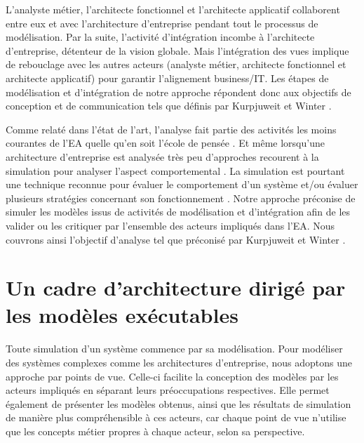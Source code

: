 L'analyste métier, l'architecte fonctionnel et l'architecte applicatif collaborent entre eux et avec l'architecture d'entreprise pendant tout le processus de modélisation. Par la suite, l'activité d'intégration incombe à l'architecte d'entreprise, détenteur de la vision globale. Mais l'intégration des vues implique de rebouclage avec les autres acteurs (analyste métier, architecte fonctionnel et architecte applicatif) pour garantir l'alignement business/IT. Les étapes de modélisation et d'intégration de notre approche répondent donc aux objectifs de conception et de communication tels que définis par Kurpjuweit et Winter \cite{kurpjuweit2007viewpoint}.

Comme relaté dans l'état de l'art, l'analyse fait partie des activités les moins courantes de l'EA quelle qu'en soit l'école de pensée \cite{chen2008architectures} \cite{barn2013enterprise}. Et même lorsqu'une architecture d'entreprise est analysée très peu d'approches recourent à la simulation pour analyser l'aspect comportemental \cite{glazner2011enterprise} \cite{manzur2015xarchimate}. La simulation est pourtant une technique reconnue pour évaluer le comportement d'un système et/ou évaluer plusieurs stratégies concernant son fonctionnement \cite{shannon1975systems}. Notre approche préconise de simuler les modèles issus de activités de modélisation et d'intégration afin de les valider ou les critiquer par l'ensemble des acteurs impliqués dans l'EA. Nous couvrons ainsi l'objectif d'analyse tel que préconisé par Kurpjuweit et Winter \cite{kurpjuweit2007viewpoint}. 



\section{Un cadre d'architecture dirigé par les modèles exécutables}

Toute simulation d'un système commence par sa modélisation. Pour modéliser des systèmes complexes comme les architectures d'entreprise, nous adoptons une approche par points de vue. Celle-ci facilite la conception des modèles par les acteurs impliqués en séparant leurs préoccupations respectives. Elle permet également de présenter les modèles obtenus, ainsi que les résultats de simulation de manière plus compréhensible à ces acteurs, car chaque point de vue n'utilise que les concepts métier propres à chaque acteur, selon sa perspective. 

